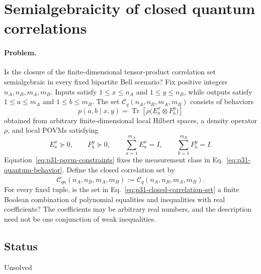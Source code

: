 \section{Semialgebraicity of closed quantum correlations}
\label{sec:op_b54ea1af90e24eaa}

\paragraph{Problem.}
Is the closure of the finite-dimensional tensor-product correlation set
semialgebraic in every fixed bipartite Bell scenario?  Fix positive integers
$n_A,n_B,m_A,m_B$.  Inputs satisfy $1\leq x\leq n_A$ and
$1\leq y\leq n_B$, while outputs satisfy $1\leq a\leq m_A$ and
$1\leq b\leq m_B$.  The set
$\mathcal C_q(n_A,n_B,m_A,m_B)$ consists of behaviors
\begin{equation}
  p(a,b\mid x,y)
  =\operatorname{Tr}\!\left[
    \rho\bigl(E_a^x\otimes F_b^y\bigr)
    \right]
  \label{eq:p31-quantum-behavior}
\end{equation}
obtained from arbitrary finite-dimensional local Hilbert spaces, a density
operator $\rho$, and local POVMs satisfying
\begin{equation}
  E_a^x\succeq0,\qquad F_b^y\succeq0,\qquad
  \sum_{a=1}^{m_A}E_a^x=I,\qquad
  \sum_{b=1}^{m_B}F_b^y=I.
  \label{eq:p31-povm-constraints}
\end{equation}
Equation~\eqref{eq:p31-povm-constraints} fixes the measurement class in
Eq.~\eqref{eq:p31-quantum-behavior}.  Define the closed correlation set by
\begin{equation}
  \mathcal C_{qa}(n_A,n_B,m_A,m_B)
  :=\overline{\mathcal C_q(n_A,n_B,m_A,m_B)}.
  \label{eq:p31-closed-correlation-set}
\end{equation}
For every fixed tuple, is the set in
Eq.~\eqref{eq:p31-closed-correlation-set} a finite Boolean combination of
polynomial equalities and inequalities with real coefficients?  The
coefficients may be arbitrary real numbers, and the description need not be
one conjunction of weak inequalities.

\subsection*{Status}

Unsolved

